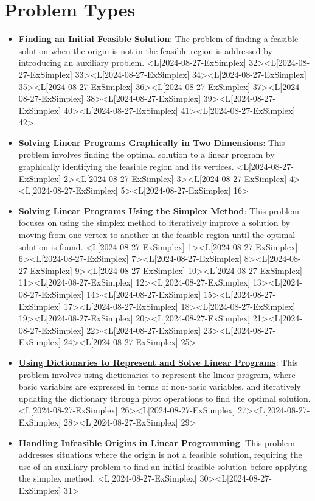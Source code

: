 \documentclass{article}%
\begin{document}
\section{Problem Types}%
\label{sec:ProblemTypes}%
\begin{itemize}[[leftmargin=*]]%
\item \href{https://www.math.purdue.edu/~yipn/421/2024-08-27-ExSimplex.pdf#page=32}{\textbf{Finding an Initial Feasible Solution}}: The problem of finding a feasible solution when the origin is not in the feasible region is addressed by introducing an auxiliary problem. <L[2024-08-27-ExSimplex] 32><L[2024-08-27-ExSimplex] 33><L[2024-08-27-ExSimplex] 34><L[2024-08-27-ExSimplex] 35><L[2024-08-27-ExSimplex] 36><L[2024-08-27-ExSimplex] 37><L[2024-08-27-ExSimplex] 38><L[2024-08-27-ExSimplex] 39><L[2024-08-27-ExSimplex] 40><L[2024-08-27-ExSimplex] 41><L[2024-08-27-ExSimplex] 42>%
\item \href{https://www.math.purdue.edu/~yipn/421/2024-08-27-ExSimplex.pdf#page=2}{\textbf{Solving Linear Programs Graphically in Two Dimensions}}: This problem involves finding the optimal solution to a linear program by graphically identifying the feasible region and its vertices. <L[2024-08-27-ExSimplex] 2><L[2024-08-27-ExSimplex] 3><L[2024-08-27-ExSimplex] 4><L[2024-08-27-ExSimplex] 5><L[2024-08-27-ExSimplex] 16>%
\item \href{https://www.math.purdue.edu/~yipn/421/2024-08-27-ExSimplex.pdf#page=1}{\textbf{Solving Linear Programs Using the Simplex Method}}: This problem focuses on using the simplex method to iteratively improve a solution by moving from one vertex to another in the feasible region until the optimal solution is found. <L[2024-08-27-ExSimplex] 1><L[2024-08-27-ExSimplex] 6><L[2024-08-27-ExSimplex] 7><L[2024-08-27-ExSimplex] 8><L[2024-08-27-ExSimplex] 9><L[2024-08-27-ExSimplex] 10><L[2024-08-27-ExSimplex] 11><L[2024-08-27-ExSimplex] 12><L[2024-08-27-ExSimplex] 13><L[2024-08-27-ExSimplex] 14><L[2024-08-27-ExSimplex] 15><L[2024-08-27-ExSimplex] 17><L[2024-08-27-ExSimplex] 18><L[2024-08-27-ExSimplex] 19><L[2024-08-27-ExSimplex] 20><L[2024-08-27-ExSimplex] 21><L[2024-08-27-ExSimplex] 22><L[2024-08-27-ExSimplex] 23><L[2024-08-27-ExSimplex] 24><L[2024-08-27-ExSimplex] 25>%
\item \href{https://www.math.purdue.edu/~yipn/421/2024-08-27-ExSimplex.pdf#page=26}{\textbf{Using Dictionaries to Represent and Solve Linear Programs}}: This problem involves using dictionaries to represent the linear program, where basic variables are expressed in terms of non-basic variables, and iteratively updating the dictionary through pivot operations to find the optimal solution. <L[2024-08-27-ExSimplex] 26><L[2024-08-27-ExSimplex] 27><L[2024-08-27-ExSimplex] 28><L[2024-08-27-ExSimplex] 29>%
\item \href{https://www.math.purdue.edu/~yipn/421/2024-08-27-ExSimplex.pdf#page=30}{\textbf{Handling Infeasible Origins in Linear Programming}}: This problem addresses situations where the origin is not a feasible solution, requiring the use of an auxiliary problem to find an initial feasible solution before applying the simplex method. <L[2024-08-27-ExSimplex] 30><L[2024-08-27-ExSimplex] 31>%
\end{itemize}%
\newpage
\end{document}
